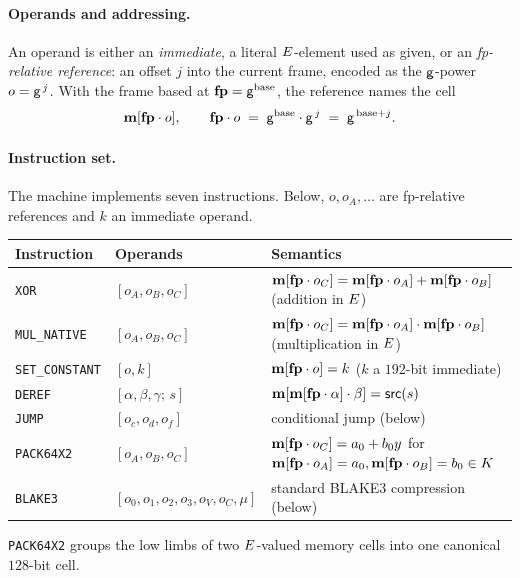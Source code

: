 \paragraph{Operands and addressing.} An operand is either an \emph{immediate}, a literal $E$-element used as given, or an \emph{fp-relative reference}: an offset $j$ into the current frame, encoded as the $\mathsf{g}$-power $o=\mathsf{g}^{\,j}$. With the frame based at $\mathbf{fp}=\mathsf{g}^{\mathrm{base}}$, the reference names the cell
\[
  \mathbf{m}[\mathbf{fp}\cdot o],\qquad \mathbf{fp}\cdot o\;=\;\mathsf{g}^{\mathrm{base}}\cdot\mathsf{g}^{\,j}\;=\;\mathsf{g}^{\,\mathrm{base}+j}.
\]

\paragraph{Instruction set.} The machine implements seven instructions. Below, $o,o_A,\dots$ are fp-relative references and $k$ an immediate operand.
\begin{center}
\begin{tabularx}{\textwidth}{@{}llX@{}}
\hline
Instruction & Operands & Semantics\\
\hline
\texttt{XOR}           & $[o_A,o_B,o_C]$ & $\mathbf{m}[\mathbf{fp}\cdot o_C]=\mathbf{m}[\mathbf{fp}\cdot o_A]+\mathbf{m}[\mathbf{fp}\cdot o_B]$ \quad(addition in $E$)\\
\texttt{MUL\_NATIVE}   & $[o_A,o_B,o_C]$ & $\mathbf{m}[\mathbf{fp}\cdot o_C]=\mathbf{m}[\mathbf{fp}\cdot o_A]\cdot\mathbf{m}[\mathbf{fp}\cdot o_B]$ (multiplication in $E$)\\
\texttt{SET\_CONSTANT} & $[o,k]$         & $\mathbf{m}[\mathbf{fp}\cdot o]=k$ \quad($k$ a $192$-bit immediate)\\
\texttt{DEREF}         & $[\alpha,\beta,\gamma;\,s]$ & $\mathbf{m}[\mathbf{m}[\mathbf{fp}\cdot \alpha]\cdot\beta]=\mathsf{src}(s)$\\
\texttt{JUMP}          & $[o_c,o_d,o_f]$ & conditional jump (below)\\
\texttt{PACK64X2}      & $[o_A,o_B,o_C]$ & $\mathbf{m}[\mathbf{fp}\cdot o_C]=a_0+b_0y$ for $\mathbf{m}[\mathbf{fp}\cdot o_A]=a_0,\mathbf{m}[\mathbf{fp}\cdot o_B]=b_0\in K$\\
\texttt{BLAKE3}        & $[o_0,o_1,o_2,o_3,o_V,o_C,\mu]$ & standard BLAKE3 compression (below)\\
\hline
\end{tabularx}
\end{center}

\texttt{PACK64X2} groups the low limbs of two $E$-valued memory cells into one canonical $128$-bit cell.

